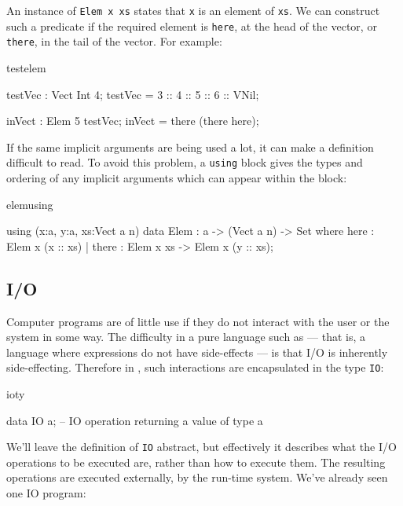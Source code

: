 \noindent
An instance of \texttt{Elem x xs} states that \texttt{x} is an element of 
\texttt{xs}. We can construct
such a predicate if the required element is \texttt{here}, at the head of the vector, 
or \texttt{there}, in the tail of the vector. For example:

\begin{SaveVerbatim}{testelem}

testVec : Vect Int 4;
testVec = 3 :: 4 :: 5 :: 6 :: VNil;

inVect : Elem 5 testVec;
inVect = there (there here);

\end{SaveVerbatim}

\noindent
If the same implicit arguments are being used a lot, it can make a definition
difficult to read. To avoid this problem, a \texttt{using} block gives the types and
ordering of any implicit arguments which can appear within the block:

\begin{SaveVerbatim}{elemusing}

using (x:a, y:a, xs:Vect a n) {
  data Elem : a -> (Vect a n) -> Set where
     here  : Elem x (x :: xs)
   | there : Elem x xs -> Elem x (y :: xs);
}

\end{SaveVerbatim}

\subsection{I/O}

Computer programs are of little use if they do not interact with the user or
the system in some way. The difficulty in a pure language such as \Idris{} ---
that is, a language where expressions do not have side-effects --- is that I/O
is inherently side-effecting. Therefore in \Idris{}, such interactions are
encapsulated in the type \texttt{IO}:

\begin{SaveVerbatim}{ioty}

data IO a; -- IO operation returning a value of type a

\end{SaveVerbatim}

We'll leave the definition of \texttt{IO} abstract, but effectively it describes what
the I/O operations to be executed are, rather than how to execute them. The
resulting operations are executed externally,
by the run-time system. We've already seen one IO
program:

